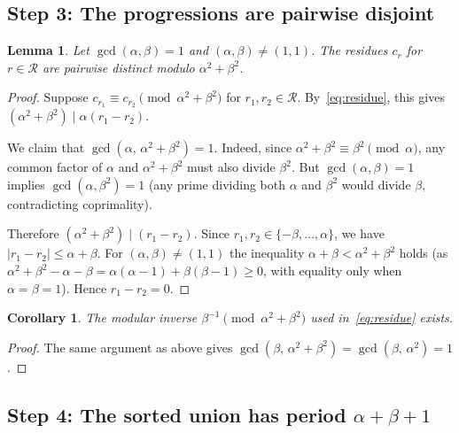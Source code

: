 \documentclass[11pt]{article}
\theoremstyle{plain}
\newtheorem{lemma}[theorem]{Lemma}
\newtheorem{corollary}[theorem]{Corollary}
\theoremstyle{definition}
\theoremstyle{remark}
\begin{document}
\subsection{Step 3: The progressions are pairwise disjoint}
\label{subsec:step3}

\begin{lemma}\label{lem:distinct}
Let $\gcd(\alpha,\beta)=1$ and $(\alpha,\beta) \ne (1,1)$.
The residues $c_r$ for $r \in \mathcal{R}$ are pairwise distinct modulo
$\alpha^2+\beta^2$.
\end{lemma}

\begin{proof}
Suppose $c_{r_1} \equiv c_{r_2} \pmod{\alpha^2+\beta^2}$ for
$r_1, r_2 \in \mathcal{R}$.  By~\eqref{eq:residue}, this gives
$(\alpha^2+\beta^2) \mid \alpha(r_1 - r_2)$.

We claim that $\gcd(\alpha,\, \alpha^2+\beta^2) = 1$.
Indeed, since $\alpha^2+\beta^2 \equiv \beta^2 \pmod{\alpha}$, any common
factor of $\alpha$ and $\alpha^2+\beta^2$ must also divide $\beta^2$.
But $\gcd(\alpha,\beta)=1$ implies $\gcd(\alpha,\beta^2)=1$ (any prime
dividing both $\alpha$ and $\beta^2$ would divide $\beta$, contradicting
coprimality).

Therefore $(\alpha^2+\beta^2) \mid (r_1 - r_2)$.
Since $r_1, r_2 \in \{-\beta, \ldots, \alpha\}$, we have
$|r_1 - r_2| \le \alpha + \beta$.
For $(\alpha,\beta) \ne (1,1)$ the inequality
$\alpha + \beta < \alpha^2 + \beta^2$ holds (as $\alpha^2+\beta^2 - \alpha
- \beta = \alpha(\alpha-1)+\beta(\beta-1) \ge 0$, with equality only when
$\alpha = \beta = 1$).
Hence $r_1 - r_2 = 0$.
\end{proof}

\begin{corollary}\label{cor:inverse}
The modular inverse $\beta^{-1} \pmod{\alpha^2+\beta^2}$ used
in~\eqref{eq:residue} exists.
\end{corollary}
\begin{proof}
The same argument as above gives
$\gcd(\beta,\, \alpha^2+\beta^2) = \gcd(\beta,\, \alpha^2) = 1$.
\end{proof}

\subsection{Step 4: The sorted union has period $\alpha+\beta+1$}
\label{subsec:step4}
\end{document}
